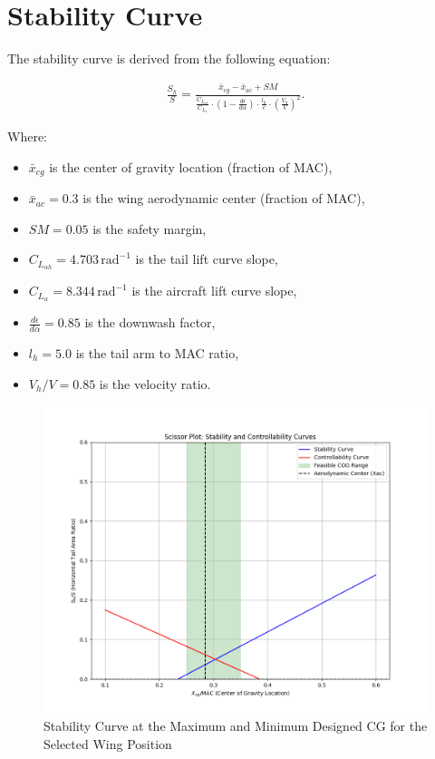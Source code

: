 \documentclass[12pt]{report}
\begin{document}
\section{Stability Curve}

The stability curve is derived from the following equation:

\begin{align}
	\frac{S_h}{S} = \frac{\bar{x}_{cg} - \bar{x}_{ac} + SM}{\frac{C_{L_{\alpha h}}}{C_{L_{\alpha}}} \cdot \left( 1 - \frac{d\epsilon}{d\alpha} \right) \cdot \frac{l_h}{c} \cdot \left( \frac{V_h}{V} \right)^2}.
\end{align}

Where:
\begin{itemize}
	\item \( \bar{x}_{cg} \) is the center of gravity location (fraction of MAC),
	\item \( \bar{x}_{ac} = 0.3 \) is the wing aerodynamic center (fraction of MAC),
	\item \( SM = 0.05 \) is the safety margin,
	\item \( C_{L_{\alpha h}} = 4.703 \, \text{rad}^{-1} \) is the tail lift curve slope,
	\item \( C_{L_{\alpha}} = 8.344 \, \text{rad}^{-1} \) is the aircraft lift curve slope,
	\item \( \frac{d\epsilon}{d\alpha} = 0.85 \) is the downwash factor,
	\item \( l_h = 5.0 \) is the tail arm to MAC ratio,
	\item \( V_h / V = 0.85 \) is the velocity ratio.
\end{itemize}

\begin{figure}[h!]
	\centering
	\includegraphics[width=5in]{Figures/Scissor_Plot.png}
	\caption{Stability Curve at the Maximum and Minimum Designed CG for the Selected Wing Position}
	\label{fig:StabilityPlot}
\end{figure}
\end{document}
